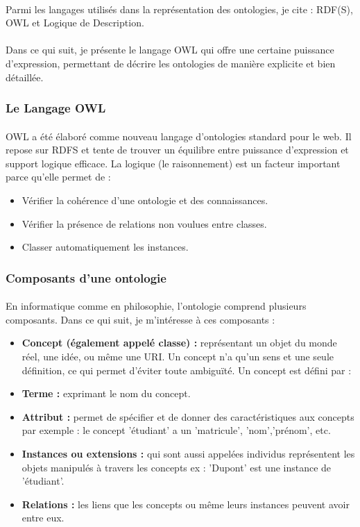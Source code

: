 \documentclass[12pt, a4paper, oneside]{book}
\begin{document}
\paragraph{}
Parmi les langages utilisés dans la représentation des ontologies, je cite : RDF(S), OWL et Logique de Description.
\paragraph{}
Dans ce qui suit, je présente le langage OWL qui offre une certaine puissance d'expression, permettant de décrire les ontologies de manière explicite et bien détaillée.

\subsubsection{Le Langage OWL}
\paragraph{}
OWL a été élaboré comme nouveau langage d'ontologies standard pour le web. Il repose sur RDFS et tente de trouver un équilibre entre puissance d'expression et support logique efficace. La logique (le raisonnement) est un facteur important parce qu'elle permet de :
\begin{itemize}
\item Vérifier la cohérence d'une ontologie et des connaissances.
\item Vérifier la présence de relations non voulues entre classes.
\item Classer automatiquement les instances.
\end{itemize}


\subsubsection{Composants d'une ontologie}
\paragraph{}
En informatique comme en philosophie, l'ontologie comprend plusieurs composants. Dans ce qui suit, je m'intéresse à ces composants :
\begin{itemize}
\item \textbf{Concept (également appelé classe) : }représentant un objet du monde réel, une idée, ou même une URI. Un concept n'a qu'un sens et une seule définition, ce qui permet d'éviter toute ambiguïté. Un concept est défini par :
\item \textbf{Terme : }exprimant le nom du concept.
\item \textbf{Attribut : }permet de spécifier et de donner des caractéristiques aux concepts par exemple : le concept 'étudiant' a un 'matricule', 'nom','prénom', etc.
\item \textbf{Instances ou extensions : }qui sont aussi appelées individus représentent les objets manipulés à travers les concepts ex : 'Dupont' est une instance de 'étudiant'.
\item \textbf{Relations : } les liens que les concepts ou même leurs instances peuvent avoir entre eux.
\end{itemize}
\end{document}
